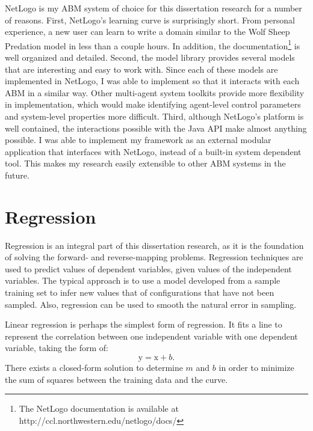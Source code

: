 NetLogo is my ABM system of choice for this dissertation research for a number of reasons.
First, NetLogo's learning curve is surprisingly short.
From personal experience, a new user can learn to write a domain similar to the Wolf Sheep Predation model in less than a couple hours.
In addition, the documentation\footnote{The NetLogo documentation is available at http://ccl.northwestern.edu/netlogo/docs/} is well organized and detailed.
Second, the model library provides several models that are interesting and easy to work with.
Since each of these models are implemented in NetLogo, I was able to implement \fw so that it interacts with each ABM in a similar way.
Other multi-agent system toolkits provide more flexibility in implementation, which would make identifying agent-level control parameters and system-level properties more difficult.
Third, although NetLogo's platform is well contained, the interactions possible with the Java API make almost anything possible.
I was able to implement my framework as an external modular application that interfaces with NetLogo, instead of a built-in system dependent tool.
This makes my research easily extensible to other ABM systems in the future.



\section{Regression}
Regression is an integral part of this dissertation research, as it is the foundation of solving the forward- and reverse-mapping problems.
Regression techniques are used to predict values of dependent variables, given values of the independent variables.
The typical approach is to use a model developed from a sample training set to infer new values that of configurations that have not been sampled.
Also, regression can be used to smooth the natural error in sampling.

Linear regression is perhaps the simplest form of regression. It fits a line to represent the correlation between one independent variable with one dependent variable, taking the form of:
\[\mathrm{y} = \mathrm{x} + b.\]
There exists a closed-form solution to determine $m$ and $b$ in order to minimize the sum of squares between the training data and the curve.

